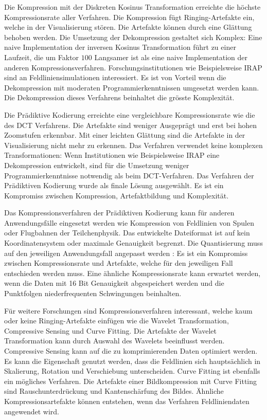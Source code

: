 Die Kompression mit der Diskreten Kosinus Transformation erreichte die höchste Kompressionsrate aller Verfahren. Die Kompression fügt Ringing-Artefakte ein, welche in der Visualisierung stören. Die Artefakte können durch eine Glättung behoben werden. Die Umsetzung der Dekompression gestaltet sich Komplex: Eine naive Implementation der inversen Kosinus Transformation führt zu einer Laufzeit, die um Faktor $100$ Langsamer ist als eine naive Implementation der anderen Kompressionsverfahren. Forschungsinstitutionen wie Beispielsweise IRAP \cite{website:irap} sind an Feldliniensimulationen interessiert. Es ist von Vorteil wenn die Dekompression mit moderaten Programmierkenntnissen umgesetzt werden kann. Die Dekompression dieses Verfahrens beinhaltet die grösste Komplexität.

Die Prädiktive Kodierung erreichte eine vergleichbare Kompressionsrate wie die des DCT Verfahrens. Die Artefakte sind weniger Ausgeprägt und erst bei hohen Zoomstufen erkennbar. Mit einer leichten Glättung sind die Artefakte in der Visualisierung nicht mehr zu erkennen. Das Verfahren verwendet keine komplexen Transformationen: Wenn Institutionen wie Beispielsweise IRAP \cite{website:irap} eine Dekompression entwickelt, sind für die Umsetzung weniger Programmierkenntnisse notwendig als beim DCT-Verfahren. Das Verfahren der Prädiktiven Kodierung wurde als finale Lösung ausgewählt. Es ist ein Kompromiss zwischen Kompression, Artefaktbildung und Komplexität.

Das Kompressionsverfahren der Prädiktiven Kodierung kann für anderen Anwendungsfälle eingesetzt werden wie Kompression von Feldlinien von Spulen oder Flugbahnen der Teilchenphysik. Das entwickelte Dateiformat ist auf kein Koordinatensystem oder maximale Genauigkeit begrenzt. Die Quantisierung muss auf den jeweiligen Anwendungsfall angepasst werden : Es ist ein Kompromiss zwischen Kompressionsrate und Artefakte, welche für den jeweiligen Fall entschieden werden muss. Eine ähnliche Kompressionsrate kann erwartet werden, wenn die Daten mit 16 Bit Genauigkeit abgespeichert werden und die Punktfolgen niederfrequenten Schwingungen beinhalten.

Für weitere Forschungen sind Kompressionsverfahren interessant, welche kaum oder keine Ringing-Artefakte einfügen wie die Wavelet Transformation, Compressive Sensing und Curve Fitting. Die Artefakte der Wavelet Transformation kann durch Auswahl des Wavelets beeinflusst werden. Compressive Sensing kann auf die zu komprimierenden Daten optimiert werden. Es kann die Eigenschaft genutzt werden, dass die Feldlinien sich hauptsächlich in Skalierung, Rotation und Verschiebung unterscheiden. Curve Fitting ist ebenfalls ein mögliches Verfahren. Die Artefakte einer Bildkompression mit Curve Fitting sind Rauschunterdrückung und Kantenschärfung des Bildes. Ähnliche Kompressionsartefakte können entstehen, wenn das Verfahren Feldliniendaten angewendet wird.


